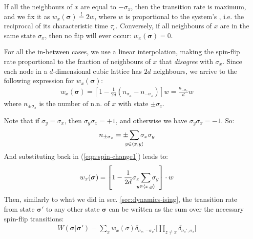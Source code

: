 \documentclass[../../main.tex]{subfiles}
\begin{document}
If all the neighbours of $x$ are equal to $-\sigma_x$, then the transition rate is maximum, and we fix it as $w_x(\bm{\sigma}) \overset{!}{=} 2w$, where $w$ is proportional to the system's , i.e. the reciprocal of its characteristic time $\tau_c$. Conversely, if all neighbours of $x$ are in the same state $\sigma_x$, then no flip will ever occur: $w_x(\bm{\sigma}) = 0$. 

For all the in-between cases, we use a linear interpolation, making the spin-flip rate proportional to the fraction of neighbours of $x$ that \textit{disagree} with $\sigma_x$. Since each node in a $d$-dimensional cubic lattice has $2d$ neighbours, we arrive to the following expression for $w_x(\bm{\sigma})$:
\begin{align}\label{eqn:spin-change1}
    w_x(\bm{\sigma}) = \left[1- \frac{1}{2d}(n_{\sigma_x} - n_{-\sigma_x}) \right] w = \frac{n_{-\sigma_x}}{d} w 
\end{align}
where $n_{\pm \sigma_x}$ is the number of n.n. of $x$ with state $\pm \sigma_x$.

Note that if $\sigma_y = \sigma_x$, then $\sigma_y \sigma_x = +1$, and otherwise we have $\sigma_y \sigma_x = -1$. So:
\begin{align*}
    n_{\pm \sigma_x} = \pm \sum_{\mathclap{y \in \langle x,y \rangle}} \sigma_x \sigma_y
\end{align*}
And substituting back in (\ref{eqn:spin-change1}) leads to:
\begin{align}\label{eqn:spin-change2}
    w_x(\bm{\sigma}) = \left[1 - \frac{1}{2d} \sigma_x \sum_{\mathclap{y \in \langle x,y \rangle}} \sigma_y \right] \cdot w
\end{align}
Then, similarly to what we did in sec. \ref{sec:dynamics-ising}, the transition rate from state $\bm{\sigma'}$ to any other state $\bm{\sigma}$ can be written as the sum over the necessary spin-flip transitions:
\begin{align*}
    W(\bm{\sigma}|\bm{\sigma'}) = \sum_x w_x(\sigma) \delta_{\sigma_x, -\sigma_x'}\Big[ \prod_{z \neq x} \delta_{\sigma_z', \sigma_z} \Big]
\end{align*}
\end{document}
